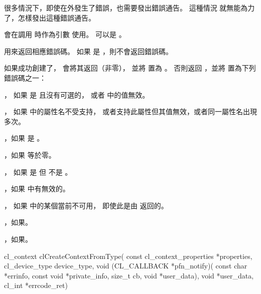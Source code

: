 \startnotepar
很多情況下，即使在外發生了錯誤，也需要發出錯誤通告。
這種情況  就無能為力了，怎樣發出這種錯誤通告。
\stopnotepar

 會在調用  時作為引數  使用。
 可以是 。

 用來返回相應錯誤碼。
如果  是 ，則不會返回錯誤碼。

如果成功創建了， 會將其返回（非零），
並將  置為 。
否則返回 ，並將  置為下列錯誤碼之一：
\startigBase
\item {}，
如果  是  且沒有可選的，
或者  中的值無效。

\item {}，
如果  中的屬性名不受支持，
或者支持此屬性但其值無效，或者同一屬性名出現多次。

\item {}，如果  是 。

\item {}，如果  等於零。

\item {}，
如果  是  但  不是 。

\item {}，如果  中有無效的。

\item {}，
如果  中的某個當前不可用，
即使此是由  返回的。

\item {}，如果\scdevfailres。

\item {}，如果\schostfailres。
\stopigBase


\startCLFUNC
cl_context clCreateContextFromType(
		const cl_context_properties *properties,
		cl_device_type device_type,
		void (CL_CALLBACK *pfn_notify)(
			const char *errinfo,
			const void *private_info,
			size_t cb,
			void *user_data),
		void *user_data,
		cl_int *errcode_ret)
\stopCLFUNC

